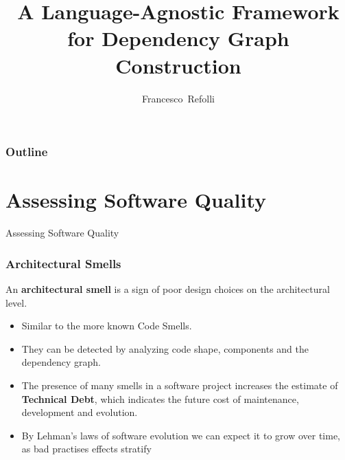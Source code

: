 \documentclass[dvipsnames, 10pt, table]{beamer}
\date[6 November 2025]{}
\title[TSD Seminary]{A Language-Agnostic Framework for Dependency Graph Construction}
\subtitle{}
\author[Francesco~Refolli]{Francesco~Refolli}
\begin{document}
\frame{\titlepage}

\begin{frame}
\frametitle{Outline}
\tableofcontents
\end{frame}


\section{Assessing Software Quality}
\begin{frame}
  \centering
  \Huge
  Assessing Software Quality
\end{frame}

\begin{frame}
  \frametitle{Architectural Smells}
  \begin{definition}
    An \textbf{architectural smell} is a sign of poor design choices on the architectural level.
  \end{definition}

  \begin{itemize}
    \item Similar to the more known Code Smells.
    \item They can be detected by analyzing code shape, components and the dependency graph.
    \item The presence of many smells in a software project increases the estimate of \textbf{Technical Debt}, which indicates the future cost of maintenance, development and evolution.
    \item By Lehman's laws of software evolution we can expect it to grow over time, as bad practises effects stratify
  \end{itemize}
\end{frame}
\end{document}
